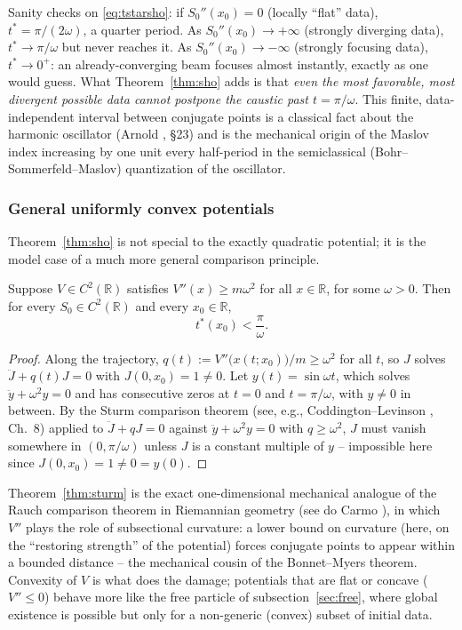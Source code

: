 Sanity checks on \eqref{eq:tstarsho}: if $S_0''(x_0)=0$ (locally ``flat''
data), $t^\ast=\pi/(2\omega)$, a quarter period. As $S_0''(x_0)\to+\infty$
(strongly diverging data), $t^\ast\to\pi/\omega$ but never reaches it. As
$S_0''(x_0)\to-\infty$ (strongly focusing data), $t^\ast\to0^+$: an
already-converging beam focuses almost instantly, exactly as one would guess.
What Theorem~\ref{thm:sho} adds is that \emph{even the most favorable, most
divergent possible data cannot postpone the caustic past $t=\pi/\omega$}. This
finite, data-independent interval between conjugate points is a classical fact
about the harmonic oscillator (Arnold \cite{Arnold}, \S23) and is the
mechanical origin of the Maslov index increasing by one unit every half-period
in the semiclassical (Bohr--Sommerfeld--Maslov) quantization of the oscillator.

\subsubsection{General uniformly convex potentials}

Theorem~\ref{thm:sho} is not special to the exactly quadratic potential; it is
the model case of a much more general comparison principle.

\begin{theorem}
\label{thm:sturm}
Suppose $V\in C^2(\mathbb{R})$ satisfies $V''(x)\ge m\omega^2$ for all
    $x\in\mathbb{R}$, for some $\omega>0$. Then for every $S_0\in
    C^2(\mathbb{R})$ and every $x_0\in\mathbb{R}$,
\[
t^\ast(x_0) < \frac{\pi}{\omega}.
\]
\end{theorem}

\begin{proof}
Along the trajectory, $q(t):=V''\big(x(t;x_0)\big)/m \ge \omega^2$ for all $t$,
    so $J$ solves $\ddot J + q(t)J=0$ with $J(0,x_0)=1\ne0$. Let
    $y(t)=\sin\omega t$, which solves $\ddot y+\omega^2y=0$ and has consecutive
    zeros at $t=0$ and $t=\pi/\omega$, with $y\ne0$ in between. By the Sturm
    comparison theorem (see, e.g., Coddington--Levinson
    \cite{CoddingtonLevinson}, Ch.~8) applied to $\ddot J+qJ=0$ against $\ddot
    y+\omega^2y=0$ with $q\ge\omega^2$, $J$ must vanish somewhere in
    $(0,\pi/\omega)$ unless $J$ is a constant multiple of $y$ -- impossible
    here since $J(0,x_0)=1\ne 0=y(0)$.
\end{proof}

\begin{remark}
Theorem~\ref{thm:sturm} is the exact one-dimensional mechanical analogue of the
    Rauch comparison theorem in Riemannian geometry (see do Carmo
    \cite{doCarmo}), in which $V''$ plays the role of subsectional curvature: a
    lower bound on curvature (here, on the ``restoring strength'' of the
    potential) forces conjugate points to appear within a bounded distance --
    the mechanical cousin of the Bonnet--Myers theorem. Convexity of $V$ is
    what does the damage; potentials that are flat or concave ($V''\le0$)
    behave more like the free particle of subsection~\ref{sec:free}, where global
    existence is possible but only for a non-generic (convex) subset of initial
    data.
\end{remark}


